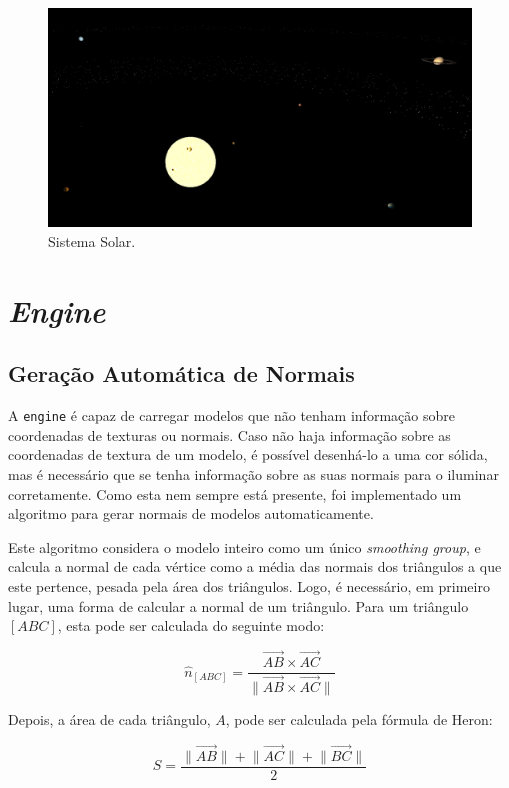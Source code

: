 \documentclass[12pt, a4paper]{article}
\begin{document}
\begin{figure}[H]
    \centering
    \includegraphics[width=\textwidth]{res/phase4/SolarSystem.png}
    \caption{Sistema Solar.}
\end{figure}

\section{\emph{Engine}}

\subsection{Geração Automática de Normais}

A \texttt{engine} é capaz de carregar modelos que não tenham informação sobre coordenadas de
texturas ou normais. Caso não haja informação sobre as coordenadas de textura de um modelo, é
possível desenhá-lo a uma cor sólida, mas é necessário que se tenha informação sobre as suas normais
para o iluminar corretamente. Como esta nem sempre está presente, foi implementado um algoritmo para
gerar normais de modelos automaticamente.

Este algoritmo considera o modelo inteiro como um único \emph{smoothing group}, e calcula a normal
de cada vértice como a média das normais dos triângulos a que este pertence, pesada pela área dos
triângulos. Logo, é necessário, em primeiro lugar, uma forma de calcular a normal de um triângulo.
Para um triângulo $[ABC]$, esta pode ser calculada do seguinte modo:

$$
\hat{n}_{[ABC]} = \frac{
    \overrightarrow{AB} \times \overrightarrow{AC}
}{
    \lVert \overrightarrow{AB} \times \overrightarrow{AC} \rVert
}
$$

Depois, a área de cada triângulo, $A$, pode ser calculada pela fórmula de Heron:

$$
S = \frac{
    \lVert \overrightarrow{AB} \rVert +
    \lVert \overrightarrow{AC} \rVert +
    \lVert \overrightarrow{BC} \rVert
}{
    2
}
$$
\end{document}
